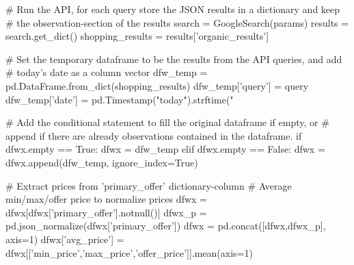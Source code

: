 \begin{python}
    # Run the API, for each query store the JSON results in a dictionary and keep 
    # the observation-section of the results
    search = GoogleSearch(params)
    results = search.get_dict()
    shopping_results = results['organic_results']

    # Set the temporary dataframe to be the results from the API queries, and add 
    # today's date as a column vector
    dfw_temp = pd.DataFrame.from_dict(shopping_results)
    dfw_temp['query'] = query
    dfw_temp['date'] = pd.Timestamp("today").strftime("%


    # Add the conditional statement to fill the original dataframe if empty, or 
    # append if there are already observations contained in the dataframe.
    if dfwx.empty == True:
        dfwx = dfw_temp
    elif dfwx.empty == False:
        dfwx = dfwx.append(dfw_temp, ignore_index=True)
        
# Extract prices from 'primary_offer' dictionary-column
# Average min/max/offer price to normalize prices
dfwx = dfwx[dfwx['primary_offer'].notnull()]
dfwx_p = pd.json_normalize(dfwx['primary_offer'])
dfwx = pd.concat([dfwx,dfwx_p], axis=1)
dfwx['avg_price'] = dfwx[['min_price','max_price','offer_price']].mean(axis=1)
        

\end{python}
